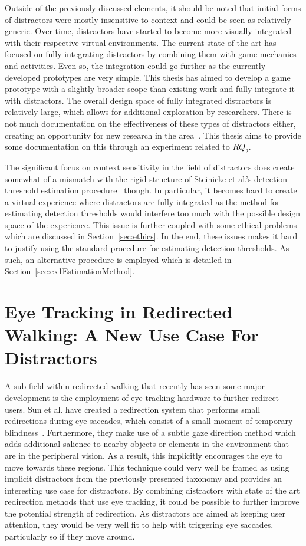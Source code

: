 Outside of the previously discussed elements, it should be noted that initial forms of distractors were mostly insensitive to context and could be seen as relatively generic. Over time, distractors have started to become more visually integrated with their respective virtual environments. The current state of the art has focused on fully integrating distractors by combining them with game mechanics and activities. Even so, the integration could go further as the currently developed prototypes are very simple. This thesis has aimed to develop a game prototype with a slightly broader scope than existing work and fully integrate it with distractors. The overall design space of fully integrated distractors is relatively large, which allows for additional exploration by researchers. There is not much documentation on the effectiveness of these types of distractors either, creating an opportunity for new research in the area~\cite{nilsson201815}. This thesis aims to provide some documentation on this through an experiment related to $RQ_2$.

The significant focus on context sensitivity in the field of distractors does create somewhat of a mismatch with the rigid structure of Steinicke et al.'s detection threshold estimation procedure~\cite{5072212} though. In particular, it becomes hard to create a virtual experience where distractors are fully integrated as the method for estimating detection thresholds would interfere too much with the possible design space of the experience. This issue is further coupled with some ethical problems which are discussed in Section~\ref{sec:ethics}. In the end, these issues makes it hard to justify using the standard procedure for estimating detection thresholds. As such, an alternative procedure is employed which is detailed in Section~\ref{sec:ex1EstimationMethod}. 

\section{Eye Tracking in Redirected Walking: A New Use Case For Distractors}\label{sec:relatedEyeTracking}
A sub-field within redirected walking that recently has seen some major development is the employment of eye tracking hardware to further redirect users. Sun et al. have created a redirection system that performs small redirections during eye saccades, which consist of a small moment of temporary blindness~\cite{sun2018towards}. Furthermore, they make use of a subtle gaze direction method which adds additional salience to nearby objects or elements in the environment that are in the peripheral vision. As a result, this implicitly encourages the eye to move towards these regions. This technique could very well be framed as using implicit distractors from the previously presented taxonomy and provides an interesting use case for distractors. By combining distractors with state of the art redirection methods that use eye tracking, it could be possible to further improve the potential strength of redirection. As distractors are aimed at keeping user attention, they would be very well fit to help with triggering eye saccades, particularly so if they move around. 

